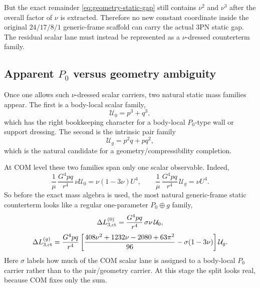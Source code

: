 \documentclass[11pt]{article}
\begin{document}
But the exact remainder \eqref{eq:geometry-static-gap} still contains $\nu^2$ and
$\nu^3$ after the overall factor of $\nu$ is extracted.  Therefore no new
constant coordinate inside the original $24/17/8/1$ generic-frame scaffold can
carry the actual $3$PN static gap.  The residual scalar lane must instead be
represented as a $\nu$-dressed counterterm family.

\subsection{Apparent \texorpdfstring{$P_0$}{P 0} versus geometry ambiguity}
\label{sec:geometry-ambiguity}

Once one allows such $\nu$-dressed scalar carriers, two natural static mass
families appear.  The first is a body-local scalar family,
\begin{equation}
\mathcal U_0=p^3+q^3,
\label{eq:geometry-U0}
\end{equation}
which has the right bookkeeping character for a body-local $P_0$-type wall or
support dressing.  The second is the intrinsic pair family
\begin{equation}
\mathcal U_g=p^2q+pq^2,
\label{eq:geometry-Ug}
\end{equation}
which is the natural candidate for a geometry/compressibility completion.

At COM level these two families span only one scalar observable.  Indeed,
\begin{equation}
\frac{1}{\mu}\,\frac{G^4pq}{r^4}\,\nu\mathcal U_0
=
\nu(1-3\nu)U^4,
\qquad
\frac{1}{\mu}\,\frac{G^4pq}{r^4}\,\mathcal U_g
=
\nu U^4.
\label{eq:geometry-U0-Ug-images}
\end{equation}
So before the exact mass algebra is used, the most natural generic-frame static
counterterm looks like a regular one-parameter $P_0\oplus g$ family,
\begin{equation}
\Delta L_{3,\rm ct}^{(0)}
=
\frac{G^4pq}{r^4}\,\sigma\nu\,\mathcal U_0,
\label{eq:geometry-sigma-P0}
\end{equation}
\begin{equation}
\Delta L_{3,\rm ct}^{(g)}
=
\frac{G^4pq}{r^4}
\left[
\frac{408\nu^2+1232\nu-2080+63\pi^2}{96}
-\sigma(1-3\nu)
\right]\mathcal U_g.
\label{eq:geometry-sigma-g}
\end{equation}
Here $\sigma$ labels how much of the COM scalar lane is assigned to a body-local
$P_0$ carrier rather than to the pair/geometry carrier.  At this stage the split
looks real, because COM fixes only the sum.
\end{document}
